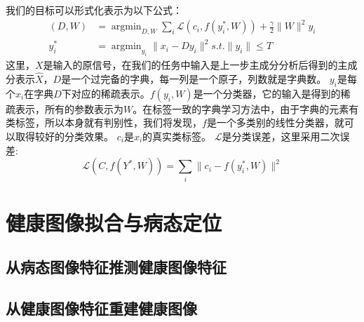     我们的目标可以形式化表示为以下公式：
    \begin{equation}
    \begin{split}
        (D, W) & = \mathop{\arg \min}_{D, W} \sum_i \mathcal{L} (c_i, f(y_i^*, W)) + \frac{\gamma}{2}\|W\| ^2
        y_i \\
        y_i^* & = \mathop{\arg \min}_{y_i} \|x_i - Dy_i\| ^2 s.t. \|y_i\| \le T
    \end{split}
    \end{equation}
    这里，$X$是输入的原信号，在我们的任务中输入是上一步主成分分析后得到的主成分表示$\hat{X}$，$D $是一个过完备的字典，每一列是一个原子，列数就是字典数。 $y_i$是每个$x_i$在字典$D$下对应的稀疏表示。$f(y_i, W)$是一个分类器，它的输入是得到的稀疏表示，所有的参数表示为$W$。在标签一致的字典学习方法中，由于字典的元素有类标签，所以本身就有判别性，我们将发现，$f$是一个多类别的线性分类器，就可以取得较好的分类效果。 $c_i$是$x_i$的真实类标签。 $\mathcal{L}$是分类误差，这里采用二次误差:
    \begin{equation}
        \mathcal{L}(C, f(Y^*, W)) = \sum _i \|c_i - f(y_i^* , W) \| ^2 
    \end{equation}
    


\section{健康图像拟合与病态定位}
\label{sec:norm-recon}
    \subsection{从病态图像特征推测健康图像特征}
    \subsection{从健康图像特征重建健康图像}



